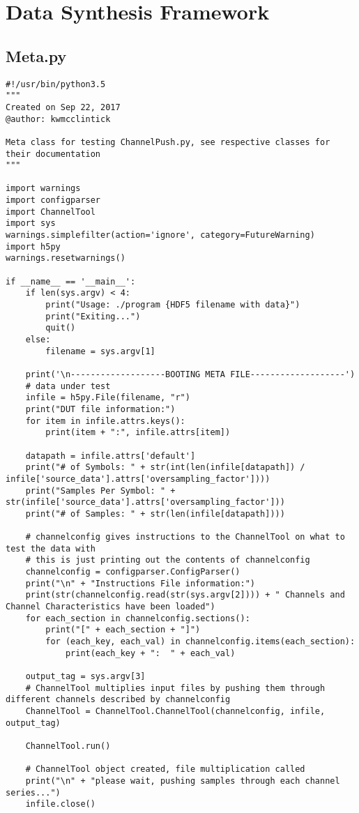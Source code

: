 \chapter{Data Synthesis Framework}
\section{Meta.py}
\begin{lstlisting}[breaklines]
#!/usr/bin/python3.5
"""
Created on Sep 22, 2017
@author: kwmcclintick

Meta class for testing ChannelPush.py, see respective classes for their documentation
"""

import warnings
import configparser
import ChannelTool
import sys
warnings.simplefilter(action='ignore', category=FutureWarning)
import h5py
warnings.resetwarnings()

if __name__ == '__main__':
    if len(sys.argv) < 4:
        print("Usage: ./program {HDF5 filename with data}")
        print("Exiting...")
        quit()
    else:
        filename = sys.argv[1]

    print('\n-------------------BOOTING META FILE-------------------')
    # data under test
    infile = h5py.File(filename, "r")
    print("DUT file information:")
    for item in infile.attrs.keys():
        print(item + ":", infile.attrs[item])

    datapath = infile.attrs['default']
    print("# of Symbols: " + str(int(len(infile[datapath]) / infile['source_data'].attrs['oversampling_factor'])))
    print("Samples Per Symbol: " + str(infile['source_data'].attrs['oversampling_factor']))
    print("# of Samples: " + str(len(infile[datapath])))

    # channelconfig gives instructions to the ChannelTool on what to test the data with
    # this is just printing out the contents of channelconfig
    channelconfig = configparser.ConfigParser()
    print("\n" + "Instructions File information:")
    print(str(channelconfig.read(str(sys.argv[2]))) + " Channels and Channel Characteristics have been loaded")
    for each_section in channelconfig.sections():
        print("[" + each_section + "]")
        for (each_key, each_val) in channelconfig.items(each_section):
            print(each_key + ":  " + each_val)

    output_tag = sys.argv[3]
    # ChannelTool multiplies input files by pushing them through different channels described by channelconfig
    ChannelTool = ChannelTool.ChannelTool(channelconfig, infile, output_tag)

    ChannelTool.run()

    # ChannelTool object created, file multiplication called
    print("\n" + "please wait, pushing samples through each channel series...")
    infile.close()

\end{lstlisting}

